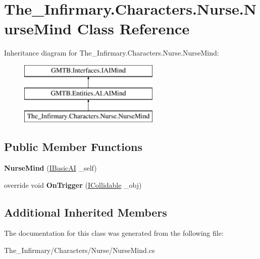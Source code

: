 \hypertarget{class_the___infirmary_1_1_characters_1_1_nurse_1_1_nurse_mind}{}\section{The\+\_\+\+Infirmary.\+Characters.\+Nurse.\+Nurse\+Mind Class Reference}
\label{class_the___infirmary_1_1_characters_1_1_nurse_1_1_nurse_mind}
Inheritance diagram for The\+\_\+\+Infirmary.\+Characters.\+Nurse.\+Nurse\+Mind\+:\begin{figure}[H]
\begin{center}
\leavevmode
\includegraphics[height=3.000000cm]{class_the___infirmary_1_1_characters_1_1_nurse_1_1_nurse_mind}
\end{center}
\end{figure}
\subsection*{Public Member Functions}
\begin{DoxyCompactItemize}
\item 
\mbox{\label{class_the___infirmary_1_1_characters_1_1_nurse_1_1_nurse_mind_acb3e9f94c9634e6ee028aaf5018f43f7}} 
{\bfseries Nurse\+Mind} (\mbox{\hyperlink{interface_g_m_t_b_1_1_interfaces_1_1_i_basic_a_i}{I\+Basic\+AI}} \+\_\+self)
\item 
\mbox{\label{class_the___infirmary_1_1_characters_1_1_nurse_1_1_nurse_mind_a35266fe6f4d10dadd532d84e366c5245}} 
override void {\bfseries On\+Trigger} (\mbox{\hyperlink{interface_g_m_t_b_1_1_collision_system_1_1_i_collidable}{I\+Collidable}} \+\_\+obj)
\end{DoxyCompactItemize}
\subsection*{Additional Inherited Members}


The documentation for this class was generated from the following file\+:\begin{DoxyCompactItemize}
\item 
The\+\_\+\+Infirmary/\+Characters/\+Nurse/Nurse\+Mind.\+cs\end{DoxyCompactItemize}
